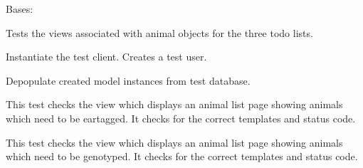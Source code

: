 \documentclass[letterpaper,10pt,english]{sphinxmanual}
\begin{document}

\begin{fulllineitems}
\label{api:mousedb.animal.tests.ToDoViewTests}
Bases: 

Tests the views associated with animal objects for the three todo lists.

\begin{fulllineitems}
\label{api:mousedb.animal.tests.ToDoViewTests.fixtures}
\end{fulllineitems}


\begin{fulllineitems}
\label{api:mousedb.animal.tests.ToDoViewTests.setUp}
Instantiate the test client.  Creates a test user.

\end{fulllineitems}


\begin{fulllineitems}
\label{api:mousedb.animal.tests.ToDoViewTests.tearDown}
Depopulate created model instances from test database.

\end{fulllineitems}


\begin{fulllineitems}
\label{api:mousedb.animal.tests.ToDoViewTests.test_eartag_list}
This test checks the view which displays an animal list page showing animals which need to be eartagged.  It checks for the correct templates and status code.

\end{fulllineitems}


\begin{fulllineitems}
\label{api:mousedb.animal.tests.ToDoViewTests.test_genotype_list}
This test checks the view which displays an animal list page showing animals which need to be genotyped.  It checks for the correct templates and status code.


\end{fulllineitems}
\end{fulllineitems}
\end{document}
